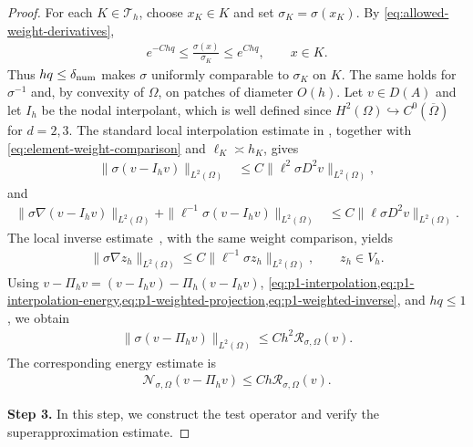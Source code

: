 \documentclass[print,wide,eng]{draft}
\begin{document}
\begin{proof}
For each $K\in\mathcal T_h$, choose $x_K\in K$ and set $\sigma_K=\sigma(x_K)$. By \cref{eq:allowed-weight-derivatives},
%
\begin{align}\label{eq:element-weight-comparison}
e^{-Chq}\leq\frac{\sigma(x)}{\sigma_K}\leq e^{Chq},\qquad x\in K.
\end{align}
%
Thus $hq\leq\delta_{\rm num}$ makes $\sigma$ uniformly comparable to $\sigma_K$ on $K$. The same holds for $\sigma^{-1}$ and, by convexity of $\Omega$, on patches of diameter $O(h)$.
Let $v\in D(A)$ and let $I_h$ be the nodal interpolant, which is well defined since $H^2(\Omega)\hookrightarrow C^0(\overline\Omega)$ for $d=2,3$. The standard local interpolation estimate in \cite[Theorem~4.4.4]{Brenner2008}, together with \cref{eq:element-weight-comparison} and $\ell_K\asymp h_K$, gives
%
\begin{align}\label{eq:p1-interpolation}
\|\sigma(v-I_hv)\|_{L^2(\Omega)}
&\leq C\|\ell^2\sigma D^2v\|_{L^2(\Omega)},
\end{align}
%
and
%
\begin{align}\label{eq:p1-interpolation-energy}
\|\sigma\nabla(v-I_hv)\|_{L^2(\Omega)}
+\|\ell^{-1}\sigma(v-I_hv)\|_{L^2(\Omega)}
&\leq C\|\ell\sigma D^2v\|_{L^2(\Omega)}.
\end{align}
%
The local inverse estimate~\cite[Lemma~4.5.3]{Brenner2008}, with the same weight comparison, yields
%
\begin{align}\label{eq:p1-weighted-inverse}
\|\sigma\nabla z_h\|_{L^2(\Omega)}
\leq C\|\ell^{-1}\sigma z_h\|_{L^2(\Omega)},\qquad z_h\in V_h.
\end{align}
%
Using $v-\Pi_hv=(v-I_hv)-\Pi_h(v-I_hv)$, \cref{eq:p1-interpolation,eq:p1-interpolation-energy,eq:p1-weighted-projection,eq:p1-weighted-inverse}, and $hq\leq1$, we obtain
%
\begin{align*}
\|\sigma(v-\Pi_hv)\|_{L^2(\Omega)}
\leq Ch^2\mathcal R_{\sigma,\Omega}(v).
\end{align*}
%
The corresponding energy estimate is
%
\begin{align*}
\mathcal N_{\sigma,\Omega}(v-\Pi_hv)
\leq Ch\mathcal R_{\sigma,\Omega}(v).
\end{align*}
%

{\bf Step 3.}
In this step, we construct the test operator and verify the superapproximation estimate.


\end{proof}
\end{document}
